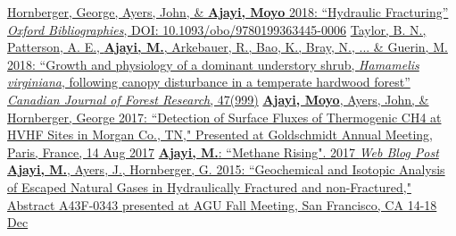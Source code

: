 %
%
%


\begin{scholarship}
					{\href{DOI: 10.1093/obo/9780199363445-0006}{Hornberger, George, Ayers, John, \& \textbf{Ajayi, Moyo} 2018: ``Hydraulic Fracturing'' \textit{Oxford Bibliographies}, DOI: 10.1093/obo/9780199363445-0006}}
					{\href{https://tspace.library.utoronto.ca/bitstream/1807/74901/2/cjfr-2016-0208.pdf}{Taylor, B. N., Patterson, A. E., \textbf{Ajayi, M.}, Arkebauer, R., Bao, K., Bray, N., ... \& Guerin, M. 2018: ``Growth and physiology of a dominant understory shrub, \textit{Hamamelis virginiana}, following canopy disturbance in a temperate hardwood forest” \textit{Canadian Journal of Forest Research}, 47(999)}}
					{\href{https://goldschmidt.info//abstracts/abstractView?id=2017003418}{\textbf{Ajayi, Moyo}, Ayers, John, \& Hornberger, George 2017: ``Detection of Surface Fluxes of Thermogenic CH4 at HVHF Sites in Morgan Co., TN," Presented at Goldschmidt Annual Meeting, Paris, France, 14 Aug 2017}}
                     { \href{https://my.vanderbilt.edu/universityfundingprograms/2017/01/methane-rising-a-brief-description-of-how-we-measured-escaped-methane-at-hydraulically-fractured-gas-wells/}{\textbf{Ajayi, M.}: ``Methane Rising". 2017 \textit{Web Blog Post}} }					
					{\href{https://abstractsearch.agu.org/meetings/2015/FM/A43F-0343.html}{\textbf{Ajayi, M.}, Ayers, J., Hornberger, G. 2015: ``Geochemical and Isotopic Analysis of Escaped Natural Gases in Hydraulically Fractured and non-Fractured," Abstract A43F-0343 presented at AGU Fall Meeting, San Francisco, CA 14-18 Dec}}
\end{scholarship}